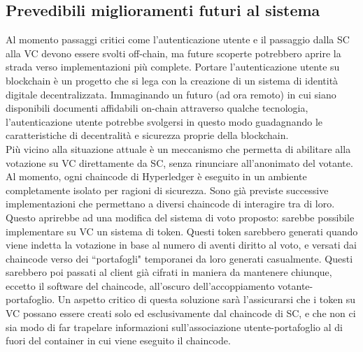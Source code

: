 	\subsection{Prevedibili miglioramenti futuri al sistema}
		Al momento passaggi critici come l'autenticazione utente e il passaggio dalla SC alla VC devono essere svolti off-chain, ma future scoperte potrebbero aprire la strada verso implementazioni più complete.
		Portare l'autenticazione utente su blockchain è un progetto che si lega con la creazione di un sistema di identità digitale decentralizzata. Immaginando un futuro (ad ora remoto) in cui siano disponibili documenti affidabili on-chain attraverso qualche tecnologia, l'autenticazione utente potrebbe svolgersi in questo modo guadagnando le caratteristiche di decentralità e sicurezza proprie della blockchain. \\
		Più vicino alla situazione attuale è un meccanismo che permetta di abilitare alla votazione su VC direttamente da SC, senza rinunciare all'anonimato del votante. Al momento, ogni chaincode di Hyperledger è eseguito in un ambiente completamente isolato per ragioni di sicurezza. Sono già previste successive implementazioni che permettano a diversi chaincode di interagire tra di loro. Questo aprirebbe ad una modifica del sistema di voto proposto: sarebbe possibile implementare su VC un sistema di token. Questi token sarebbero generati quando viene indetta la votazione in base al numero di aventi diritto al voto, e versati dai chaincode verso dei ``portafogli" temporanei da loro generati casualmente. Questi sarebbero poi passati al client già cifrati in maniera da mantenere chiunque, eccetto il software del chaincode, all'oscuro dell'accoppiamento votante-portafoglio. Un aspetto critico di questa soluzione sarà l'assicurarsi che i token su VC possano essere creati solo ed esclusivamente dal chaincode di SC, e che non ci sia modo di far trapelare informazioni sull'associazione utente-portafoglio al di fuori del container in cui viene eseguito il chaincode.